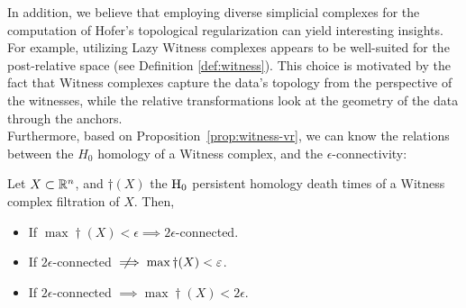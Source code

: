 \documentclass[../main.tex]{subfiles}
\begin{document}
In addition, we believe that employing diverse simplicial complexes for the computation of Hofer's topological regularization can yield interesting insights. For example, utilizing Lazy Witness complexes appears to be well-suited for the post-relative space (see Definition \ref{def:witness}). This choice is motivated by the fact that Witness complexes capture the data's topology from the perspective of the witnesses, while the relative transformations look at the geometry of the data through the anchors.\\

Furthermore, based on Proposition~\ref{prop:witness-vr}, we can know the relations between the $H_0$ homology of a Witness complex, and the $\epsilon$-connectivity:
\begin{corollary}
Let $X\subset \mathbb{R}^n$, and $\dag(X)$ the $\text{\rm H}_0$ persistent homology death times of a Witness complex filtration of $X$. Then,
\begin{itemize}
    \item If $\max \dag(X) < \epsilon \implies 2\epsilon$-connected.
    \item If $2\epsilon$-connected $\notimplies \max \dag(X) < \epsilon$.
    \item If $2\epsilon$-connected $\implies \max \dag(X) < 2\epsilon$.
\end{itemize}
\end{corollary}
\end{document}
